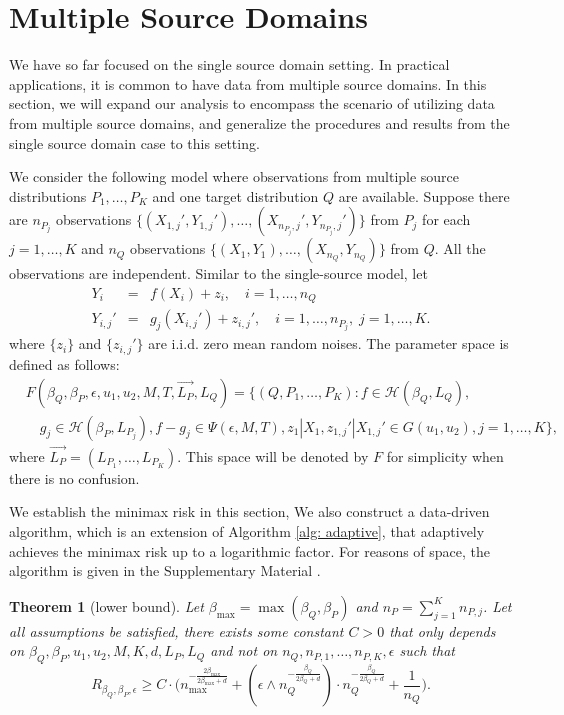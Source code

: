 \documentclass{article}
\def\H{\mathcal{H}}
\def\bmax{\beta_{\max}}
\newtheorem{theorem}{Theorem}
\begin{document}
\section{Multiple Source Domains}
\label{section: multiple}

We have so far focused on the single source domain setting. In practical applications, it is common to have data from multiple source domains. In this section, we will expand our analysis to encompass the scenario of utilizing data from multiple source domains, and generalize the procedures and results from the single source domain case to this setting.

We consider the following model  where observations from multiple source distributions $P_1,\dots,P_K$ and one target distribution $Q$ are available. Suppose  there are $n_{P_j}$ observations $\{(X_{1,j}',Y_{1,j}'),\dots,(X_{n_{P_j},j}',Y_{n_{P_j},j}')\}$ from $P_j$ for each $j=1,\dots,K$ and $n_Q$ observations $\{(X_1,Y_1),\dots,(X_{n_Q},Y_{n_Q})\}$ from $Q$. All the observations are independent. Similar to the single-source model, let
\begin{eqnarray*}
Y_{i} &=& f(X_{i})+z_{i}, \quad i=1,\dots,n_Q\\
Y_{i,j}' &=& g_j(X_{i,j}')+z_{i,j}', \quad i=1,\dots,n_{P_j}, \; j=1,\dots,K.
\end{eqnarray*}
where $\{z_{i}\}$ and $\{z_{i,j}'\}$ are i.i.d. zero mean random noises. The parameter space is defined as follows:
\begin{align*}
&F(\beta_Q,\beta_P,\epsilon,u_1,u_2,M,T,\overrightarrow{L_P},L_Q)=\bigg\{(Q,P_1,\dots,P_K):f\in \H(\beta_Q,L_Q),\\
&\quad g_j\in \H(\beta_{P},L_{P_j}), f-g_j\in\Psi(\epsilon,M,T),z_1 |X_1, z_{1,j}' |X_{1,j}'\in G(u_1,u_2),j=1,\dots,K\bigg\},
\end{align*}
where $\overrightarrow{L_P}=(L_{P_1},\dots,L_{P_K})$. This space will be denoted by $F$ for simplicity when there is no confusion. 

We establish the minimax risk in this section,  We also construct a data-driven algorithm, which is an extension of Algorithm \ref{alg: adaptive},  that adaptively achieves the minimax risk up to a logarithmic factor. For reasons of space, the algorithm is given in the Supplementary Material \citep{CaiPu}. 

\begin{theorem}[lower bound]\label{th: lower bound multi}
Let $\bmax=\max(\beta_Q,\beta_P)$ and $n_P=\sum_{j=1}^K n_{P,j}$. Let all assumptions be satisfied, there exists some constant $C>0$ that only depends on $\beta_Q,\beta_P,u_1,u_2,M,K,d,L_P,L_Q$ and not on $n_Q,n_{P,1},\dots,n_{P,K},\epsilon$ such that
 $$R_{\beta_Q,\beta_P,\epsilon}\geq C\cdot\bigg( n_{\max}^{-\frac{2\bmax}{2\bmax+d}}+ (\epsilon \wedge n_Q^{-\frac{\beta_Q}{2\beta_Q+d}})\cdot n_Q^{-\frac{\beta_Q}{2\beta_Q+d}}+\frac{1}{n_Q}\bigg).$$
\end{theorem}
\end{document}
